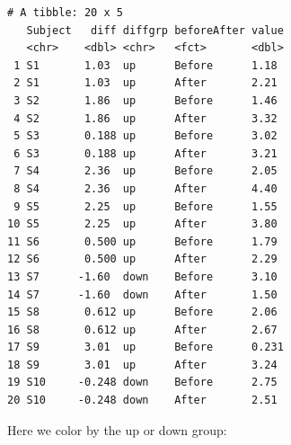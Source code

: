 \documentclass[
  letterpaper,
  DIV=11,
  numbers=noendperiod]{scrreprt}
\newenvironment{Shaded}{\begin{snugshade}}{\end{snugshade}}
\newcommand{\AttributeTok}[1]{\textcolor[rgb]{0.40,0.45,0.13}{#1}}
\newcommand{\DecValTok}[1]{\textcolor[rgb]{0.68,0.00,0.00}{#1}}
\newcommand{\FunctionTok}[1]{\textcolor[rgb]{0.28,0.35,0.67}{#1}}
\newcommand{\NormalTok}[1]{\textcolor[rgb]{0.00,0.23,0.31}{#1}}
\newcommand{\OtherTok}[1]{\textcolor[rgb]{0.00,0.23,0.31}{#1}}
\newcommand{\SpecialCharTok}[1]{\textcolor[rgb]{0.37,0.37,0.37}{#1}}
\newcommand{\StringTok}[1]{\textcolor[rgb]{0.13,0.47,0.30}{#1}}
\begin{document}
\begin{Shaded}
\end{Shaded}

\begin{verbatim}
# A tibble: 20 x 5
   Subject   diff diffgrp beforeAfter value
   <chr>    <dbl> <chr>   <fct>       <dbl>
 1 S1       1.03  up      Before      1.18 
 2 S1       1.03  up      After       2.21 
 3 S2       1.86  up      Before      1.46 
 4 S2       1.86  up      After       3.32 
 5 S3       0.188 up      Before      3.02 
 6 S3       0.188 up      After       3.21 
 7 S4       2.36  up      Before      2.05 
 8 S4       2.36  up      After       4.40 
 9 S5       2.25  up      Before      1.55 
10 S5       2.25  up      After       3.80 
11 S6       0.500 up      Before      1.79 
12 S6       0.500 up      After       2.29 
13 S7      -1.60  down    Before      3.10 
14 S7      -1.60  down    After       1.50 
15 S8       0.612 up      Before      2.06 
16 S8       0.612 up      After       2.67 
17 S9       3.01  up      Before      0.231
18 S9       3.01  up      After       3.24 
19 S10     -0.248 down    Before      2.75 
20 S10     -0.248 down    After       2.51 
\end{verbatim}

Here we color by the up or down group:
\end{document}
